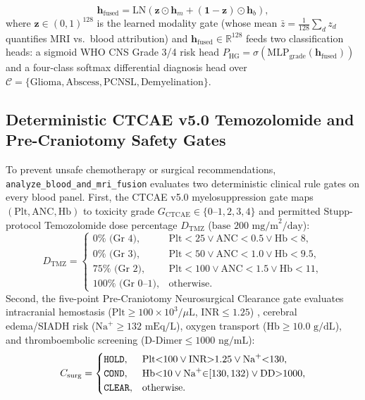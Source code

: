 \documentclass[conference]{IEEEtran}
\begin{document}
\begin{equation}
    \mathbf{h}_{\text{fused}} = \text{LN}\!\left(\mathbf{z} \odot \mathbf{h}_m + (\mathbf{1} - \mathbf{z}) \odot \mathbf{h}_b\right),
    \label{eq:gmu_fused}
\end{equation}
where $\mathbf{z} \in (0,1)^{128}$ is the learned modality gate (whose mean $\bar{z} = \frac{1}{128}\sum_d z_d$ quantifies MRI vs.\ blood attribution) and $\mathbf{h}_{\text{fused}} \in \mathbb{R}^{128}$ feeds two classification heads: a sigmoid WHO CNS Grade 3/4 risk head $P_{\text{HG}} = \sigma(\text{MLP}_{\text{grade}}(\mathbf{h}_{\text{fused}}))$ and a four-class softmax differential diagnosis head over $\mathcal{C} = \{\text{Glioma}, \text{Abscess}, \text{PCNSL}, \text{Demyelination}\}$.

\subsection{Deterministic CTCAE v5.0 Temozolomide and Pre-Craniotomy Safety Gates}
To prevent unsafe chemotherapy or surgical recommendations, \texttt{analyze\_blood\_and\_mri\_fusion} evaluates two deterministic clinical rule gates on every blood panel. First, the CTCAE v5.0 myelosuppression gate \cite{stupp2005radiotherapy, ctcae2017v5} maps $(\text{Plt}, \text{ANC}, \text{Hb})$ to toxicity grade $G_{\text{CTCAE}} \in \{0\text{--}1, 2, 3, 4\}$ and permitted Stupp-protocol Temozolomide dose percentage $D_{\text{TMZ}}$ ($\text{base } 200\text{ mg/m}^2/\text{day}$):
\begin{equation}
    D_{\text{TMZ}} = \begin{cases}
    0\%\text{ (Gr 4)}, & \text{Plt}{<}25 \lor \text{ANC}{<}0.5 \lor \text{Hb}{<}8, \\
    0\%\text{ (Gr 3)}, & \text{Plt}{<}50 \lor \text{ANC}{<}1.0 \lor \text{Hb}{<}9.5, \\
    75\%\text{ (Gr 2)}, & \text{Plt}{<}100 \lor \text{ANC}{<}1.5 \lor \text{Hb}{<}11, \\
    100\%\text{ (Gr 0--1)}, & \text{otherwise}.
    \end{cases}
    \label{eq:ctcae_gate}
\end{equation}
Second, the five-point Pre-Craniotomy Neurosurgical Clearance gate evaluates intracranial hemostasis ($\text{Plt} \ge 100 \times 10^3/\mu\text{L}$, $\text{INR} \le 1.25$) \cite{lichaos2015platelet}, cerebral edema/SIADH risk ($\text{Na}^+ \ge 132\text{ mEq/L}$), oxygen transport ($\text{Hb} \ge 10.0\text{ g/dL}$), and thromboembolic screening ($\text{D-Dimer} \le 1000\text{ ng/mL}$):
\begin{equation}
    C_{\text{surg}} = \begin{cases}
    \text{\texttt{HOLD}}, & \text{Plt}{<}100 \lor \text{INR}{>}1.25 \lor \text{Na}^+{<}130, \\
    \text{\texttt{COND}}, & \text{Hb}{<}10 \lor \text{Na}^+{\in}[130,132) \lor \text{DD}{>}1000, \\
    \text{\texttt{CLEAR}}, & \text{otherwise}.
    \end{cases}
    \label{eq:surg_gate}
\end{equation}
\end{document}
